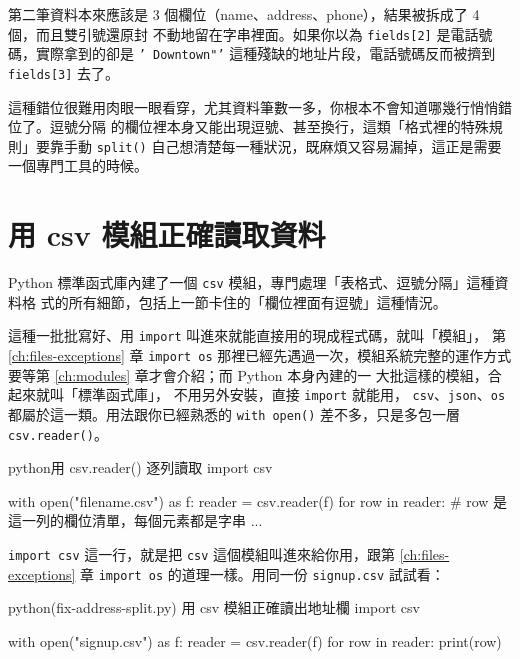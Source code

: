 
第二筆資料本來應該是 3 個欄位（name、address、phone），結果被拆成了 4 個，而且雙引號還原封
不動地留在字串裡面。如果你以為 \texttt{fields[2]} 是電話號碼，實際拿到的卻是
\texttt{' Downtown"'} 這種殘缺的地址片段，電話號碼反而被擠到 \texttt{fields[3]} 去了。

這種錯位很難用肉眼一眼看穿，尤其資料筆數一多，你根本不會知道哪幾行悄悄錯位了。逗號分隔
的欄位裡本身又能出現逗號、甚至換行，這類「格式裡的特殊規則」要靠手動 \texttt{split()}
自己想清楚每一種狀況，既麻煩又容易漏掉，這正是需要一個專門工具的時候。

\section{用 csv 模組正確讀取資料}
\label{sec:csv-module-read}

Python 標準函式庫內建了一個 \texttt{csv} 模組，專門處理「表格式、逗號分隔」這種資料格
式的所有細節，包括上一節卡住的「欄位裡面有逗號」這種情況。

這種一批批寫好、用
\texttt{import} 叫進來就能直接用的現成程式碼，就叫「模組」，
第 \ref{ch:files-exceptions} 章 \texttt{import os}
那裡已經先遇過一次，模組系統完整的運作方式要等第 \ref{ch:modules} 章才會介紹；而 Python 本身內建的一
大批這樣的模組，合起來就叫「標準函式庫」，
不用另外安裝，直接 \texttt{import} 就能用，
\texttt{csv}、\texttt{json}、\texttt{os} 都屬於這一類。用法跟你已經熟悉的
\texttt{with open()} 差不多，只是多包一層 \texttt{csv.reader()}。

\begin{code}{python}{用 csv.reader() 逐列讀取}
import csv

with open("filename.csv") as f:
    reader = csv.reader(f)
    for row in reader:
        # row 是這一列的欄位清單，每個元素都是字串
        ...
\end{code}

\texttt{import csv} 這一行，就是把 \texttt{csv} 這個模組叫進來給你用，跟第 \ref{ch:files-exceptions} 章
\texttt{import os} 的道理一樣。用同一份 \texttt{signup.csv} 試試看：

\begin{example}{python}{(fix-address-split.py) 用 csv 模組正確讀出地址欄}
import csv

with open("signup.csv") as f:
    reader = csv.reader(f)
    for row in reader:
        print(row)
\end{example}

